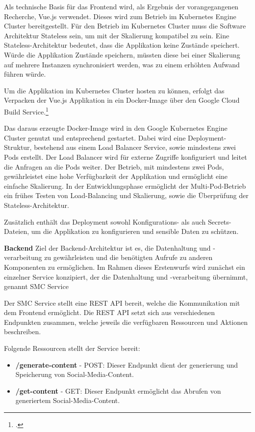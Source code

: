 Als technische Basis für das Frontend wird, als Ergebnis der vorangegangenen Recherche, Vue.js verwendet.
Dieses wird zum Betrieb im Kubernetes Engine Cluster bereitgestellt.
Für den Betrieb im Kubernetes Cluster muss die Software Architektur Stateless sein, um mit der Skalierung kompatibel zu sein.
Eine Stateless-Architektur bedeutet, dass die Applikation keine Zustände speichert.
Würde die Applikation Zustände speichern, müssten diese bei einer Skalierung auf mehrere Instanzen synchronisiert werden, was zu einem erhöhten Aufwand führen würde.

Um die Applikation im Kubernetes Cluster hosten zu können, erfolgt das Verpacken der Vue.js Applikation in ein Docker-Image über den Google Cloud Build Service.\footcite{google_cloud_build}

Das daraus erzeugte Docker-Image wird in den Google Kubernetes Engine Cluster genutzt und entsprechend gestartet.
Dabei wird eine Deployment-Struktur, bestehend aus einem Load Balancer Service, sowie mindestens zwei Pods erstellt.
Der Load Balancer wird für externe Zugriffe konfiguriert und leitet die Anfragen an die Pods weiter.
Der Betrieb, mit mindestens zwei Pods, gewährleistet eine hohe Verfügbarkeit der Applikation und ermöglicht eine einfache Skalierung.
In der Entwicklungsphase ermöglicht der Multi-Pod-Betrieb ein frühes Testen von Load-Balancing und Skalierung, sowie die Überprüfung der Stateless-Architektur.

Zusätzlich enthält das Deployment sowohl Konfigurations- als auch Secrets-Dateien, um die Applikation zu konfigurieren und sensible Daten zu schützen.

\textbf{Backend}\newline
Ziel der Backend-Architektur ist es, die Datenhaltung und -verarbeitung zu gewährleisten und die benötigten Aufrufe zu anderen Komponenten zu ermöglichen.
Im Rahmen dieses Erstenwurfs wird zunächst ein einzelner Service konzipiert, der die Datenhaltung und -verarbeitung übernimmt, genannt \ac{SMC} Service

Der \ac{SMC} Service stellt eine \ac{REST} \ac{API} bereit, welche die Kommunikation mit dem Frontend ermöglicht.
Die \ac{REST} \ac{API} setzt sich aus verschiedenen Endpunkten zusammen, welche jeweils die verfügbaren Ressourcen und Aktionen beschreiben.

Folgende Ressourcen stellt der Service bereit:
\begin{itemize}
    \item \textbf{/generate-content} - POST: Dieser Endpunkt dient der generierung und Speicherung von Social-Media-Content.
    \item \textbf{/get-content} - GET: Dieser Endpunkt ermöglicht das Abrufen von generiertem Social-Media-Content.
\end{itemize}

